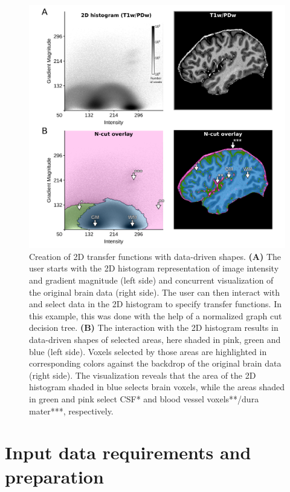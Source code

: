 \begin{figure}[htb!]
\centering
\includegraphics[width=\textwidth]{figures/chapter_02/figure_3.png}
\caption{Creation of 2D transfer functions with data-driven shapes. \textbf{(A)} The user starts with the 2D histogram representation of image intensity and gradient magnitude (left side) and concurrent visualization of the original brain data (right side). The user can then interact with and select data in the 2D histogram to specify transfer functions. In this example, this was done with the help of a normalized graph cut decision tree. \textbf{(B)} The interaction with the 2D histogram results in data-driven shapes of selected areas, here shaded in pink, green and blue (left side). Voxels selected by those areas are highlighted in corresponding colors against the backdrop of the original brain data (right side). The visualization reveals that the area of the 2D histogram shaded in blue selects brain voxels, while the areas shaded in green and pink select CSF* and blood vessel voxels**/dura mater***, respectively.}
\label{fig:Fig3}
\end{figure}

\section{Input data requirements and preparation}
\label{sec:DataRequirements}
